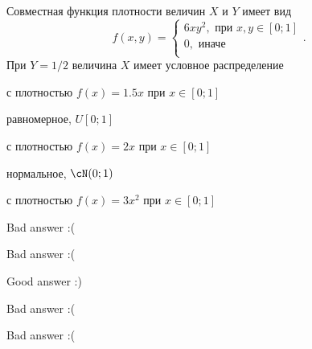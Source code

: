 
\begin{question}
Совместная функция плотности величин \(X\) и \(Y\) имеет вид \[
f(x,y) =
\begin{cases}
6xy^2, \text{ при } x, y \in [0;1] \\
0, \text{ иначе } \\
\end{cases}.
\] При \(Y=1/2\) величина \(X\) имеет условное распределение
\begin{answerlist}
  \item с плотностью \(f(x)=1.5x\) при \(x\in[0;1]\)
  \item равномерное, \(U[0;1]\)
  \item с плотностью \(f(x)=2x\) при \(x\in[0;1]\)
  \item нормальное, \(\cN(0;1)\)
  \item с плотностью \(f(x)=3x^2\) при \(x\in[0;1]\)
\end{answerlist}
\end{question}

\begin{solution}
\begin{answerlist}
  \item Bad answer :(
  \item Bad answer :(
  \item Good answer :)
  \item Bad answer :(
  \item Bad answer :(
\end{answerlist}
\end{solution}

